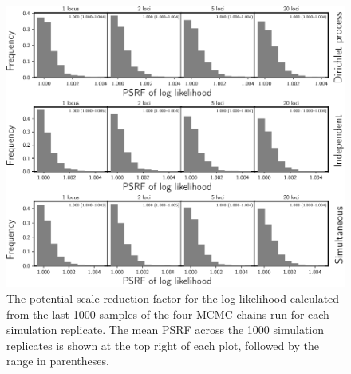 \begin{figure}[htbp]
    \begin{center}
        \includegraphics[width=\textwidth,height=0.9\textheight,keepaspectratio]{../images/from-project-repo/plots/tex-plot-grids/grid-psrf-lnl-histograms-cropped.pdf}
        \caption{
            The potential scale reduction factor \citep[PSRF; the square root
            of Equation 1.1 in][]{Brooks1998}
            for the log likelihood calculated from the last 1000
            samples of the four MCMC chains run for each simulation replicate.
            The mean PSRF across the 1000 simulation replicates is shown at the
            top right of each plot, followed by the range in parentheses.
        }
        \label{fig:psrflnl}
    \end{center}
\end{figure}

